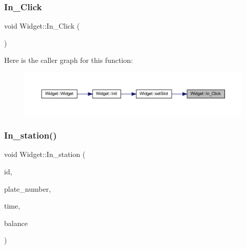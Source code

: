 \subsubsection{\texorpdfstring{In\_Click}{In\_Click}}
{\footnotesize\ttfamily void Widget\+::\+In\+\_\+\+Click (\begin{DoxyParamCaption}{ }\end{DoxyParamCaption})\hspace{0.3cm}{\ttfamily [slot]}}

Here is the caller graph for this function\+:
\nopagebreak
\begin{figure}[H]
\begin{center}
\leavevmode
\includegraphics[width=350pt]{class_widget_a9dc8ecbea303faeb17e08ef888754cf9_icgraph}
\end{center}
\end{figure}
\mbox{\label{class_widget_a9288c149d01aec945f48b6f064f3c7dd}} 
\subsubsection{\texorpdfstring{In\_station()}{In\_station()}}
{\footnotesize\ttfamily void Widget\+::\+In\+\_\+station (\begin{DoxyParamCaption}\item[{Q\+String}]{id,  }\item[{Q\+String}]{plate\+\_\+number,  }\item[{Q\+String}]{time,  }\item[{float}]{balance }\end{DoxyParamCaption})}

